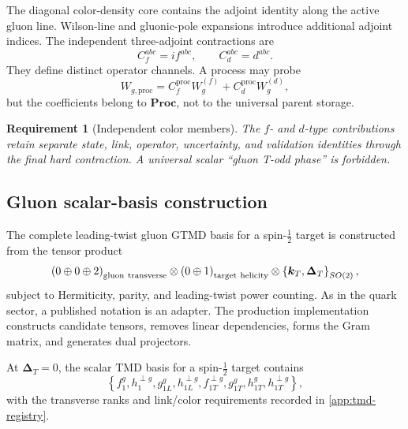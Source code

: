 \documentclass[11pt]{article}
\newtheorem{requirement}[definition]{Requirement}
\newcommand{\kT}{\bm{k}_{T}}
\newcommand{\DT}{\bm{\Delta}_{T}}
\newcommand{\Proc}{\mathbf{Proc}}
\begin{document}
The diagonal color-density core contains the adjoint identity along the
active gluon line.  Wilson-line and gluonic-pole expansions introduce
additional adjoint indices.  The independent three-adjoint contractions are
\cite{Buffing2013,Boer2016}
\begin{equation}
 C_f^{abc}=if^{abc},
 \qquad
 C_d^{abc}=d^{abc}.
\label{eq:fd-color-tensors}
\end{equation}
They define distinct operator channels.  A process may probe
\begin{equation}
 W_{g,\mathrm{proc}}
 =C_f^{\mathrm{proc}}W_g^{(f)}
 +C_d^{\mathrm{proc}}W_g^{(d)},
\label{eq:process-fd-combination}
\end{equation}
but the coefficients belong to \(\Proc\), not to the universal parent
storage.

\begin{requirement}[Independent color members]
\label{req:independent-color-members}
The \(f\)- and \(d\)-type contributions retain separate state, link,
operator, uncertainty, and validation identities through the final hard
contraction.  A universal scalar ``gluon T-odd phase'' is forbidden.
\end{requirement}

\subsection{Gluon scalar-basis construction}

The complete leading-twist gluon GTMD basis for a spin-\(\tfrac12\) target is
constructed from the tensor product
\begin{equation}
 \left(0\oplus0\oplus2\right)_{\rm gluon\ transverse}
 \otimes
 \left(0\oplus1\right)_{\rm target\ helicity}
 \otimes
 \left\{\kT,\DT\right\}_{SO(2)},
\label{eq:gluon-basis-product}
\end{equation}
subject to Hermiticity, parity, and leading-twist power counting.  As in the
quark sector, a published notation is an adapter.  The production
implementation constructs candidate tensors, removes linear dependencies,
forms the Gram matrix, and generates dual projectors.

At \(\DT=0\), the scalar TMD basis for a spin-\(\tfrac12\) target contains
\begin{equation}
 \left\{
 f_1^g,
 h_1^{\perp g},
 g_{1L}^g,
 h_{1L}^{\perp g},
 f_{1T}^{\perp g},
 g_{1T}^g,
 h_{1T}^g,
 h_{1T}^{\perp g}
 \right\},
\label{eq:gluon-tmd-inventory}
\end{equation}
with the transverse ranks and link/color requirements recorded in
\cref{app:tmd-registry}.
\end{document}
